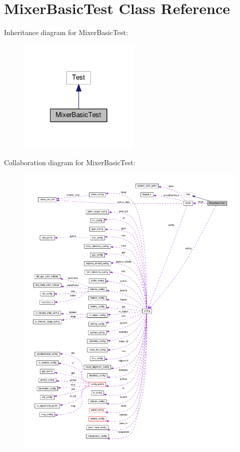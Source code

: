 \hypertarget{classMixerBasicTest}{\section{Mixer\+Basic\+Test Class Reference}
\label{classMixerBasicTest}
}


Inheritance diagram for Mixer\+Basic\+Test\+:\nopagebreak
\begin{figure}[H]
\begin{center}
\leavevmode
\includegraphics[width=164pt]{classMixerBasicTest__inherit__graph}
\end{center}
\end{figure}


Collaboration diagram for Mixer\+Basic\+Test\+:\nopagebreak
\begin{figure}[H]
\begin{center}
\leavevmode
\includegraphics[width=350pt]{classMixerBasicTest__coll__graph}
\end{center}
\end{figure}
